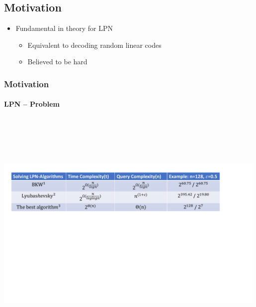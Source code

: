 \documentclass{beamer}
\begin{document}
\subsection{Motivation}
\begin{frame}
	\begin{itemize}
		\item Fundamental in theory for LPN%
		\begin{itemize}
			\item Equivalent to decoding random linear codes
			\item Believed to be hard%
		\end{itemize}	
	\end{itemize}

\end{frame}


\begin{frame}
	\frametitle{Motivation}
	\framesubtitle{LPN -- Problem}
	 \includegraphics[width=5.2in,height=4.8in]{LPN-algorithm.pdf}
	\vspace{0.5cm}
\end{frame}
\end{document}
